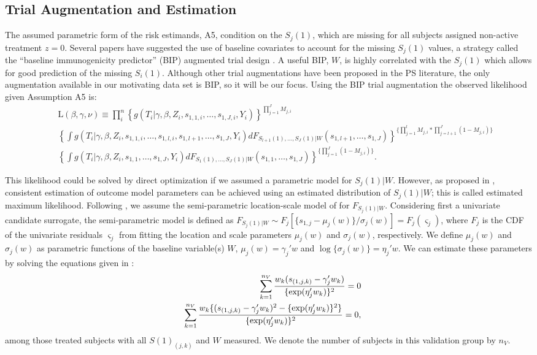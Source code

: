 \documentclass[times, doublespace]{simauth}
\begin{document}
\subsection{Trial Augmentation and Estimation} \label{EST}
The assumed parametric form of the risk estimands, A5, condition on the $S_{j}(1)$, which are missing for all subjects assigned non-active treatment $z=0$. Several papers have suggested the use of baseline covariates to account for the missing $S_{j}(1)$ values, a strategy called the ``baseline immunogenicity predictor'' (BIP) augmented trial design \citep{Follmann06, Gilbert08}. A useful BIP, $W$, is highly correlated with the $S_{j}(1)$ which allows for good prediction of the missing $S_i(1)$. Although other trial augmentations have been proposed in the PS literature, the only augmentation available in our motivating data set is BIP, so it will be our focus. Using the BIP trial augmentation the observed likelihood given Assumption A5 is:
\begin{eqnarray*}
&&\mbox{L}(\beta,\gamma,\nu) \equiv \prod^{n}_i\left\{g(T_i|\gamma, \beta, Z_i, s_{1,1,i},\ldots,s_{1,J,i}, Y_i)\right\}^{\prod_{j=1}^{J}{M_{j,i}}}\\ 
&&\left\{\int g(T_i|\gamma, \beta, Z_i,s_{1,1,i},\ldots, s_{1,l,i}, s_{1,l+1},\ldots, s_{1,J}, Y_i)dF_{S_{l+1}(1),\ldots,S_{J}(1)|W}(s_{1,l+1},\ldots,s_{1,J})\right\}^{\{\prod_{j=1}^{l}{M_{j,i}}*\prod_{j=l+1}^{J}{(1-M_{j,i})}\}}\\ 
&&\left\{\int g(T_i|\gamma, \beta, Z_i,s_{1,1}, \ldots, s_{1,J}, Y_i)dF_{S_{1}(1),\ldots, S_{J}(1)|W}(s_{1,1},\ldots, s_{1,J})\right\}^{\{\prod_{j=1}^{J}{(1-M_{j,i})}\}}.
\end{eqnarray*}

This likelihood could be solved by direct optimization if we assumed a parametric model for $S_j(1)|W$. However, as proposed in \citet{Pepe91}, consistent estimation of outcome model parameters can be achieved using an estimated distribution of $S_j(1)|W$; this is called estimated maximum likelihood. Following \citet{Huang11}, we assume the semi-parametric location-scale model of \citet{Heagerty99} for $F_{S_{j}(1)|W}$. Considering first a univariate candidate surrogate, the semi-parametric model is defined as $F_{S_{j}(1)|W} \sim F_j[\{s_{1,j} -\mu_j(w)\} / \sigma_j(w)]= F_j(\varsigma_j)$, where $F_j$ is the CDF of the univariate residuals $\varsigma_j$ from fitting the location and scale parameters $\mu_j(w)$ and $\sigma_j(w)$, respectively.  We define $\mu_j(w)$ and $\sigma_j(w)$ as parametric functions of the baseline variable(s) $W$, $\mu_j(w) = \gamma_j'w$ and $\log\{\sigma_j(w)\} = \eta_j'w$. We can estimate these parameters by solving the equations given in \citet{Heagerty99}:
\begin{eqnarray}
&&\sum_{k=1}^{n_V} {w_{k} (s_{(1,j,k)} - \gamma_j' w_{k} )\over \{\exp(\eta_j'w_k)\}^2} =0\\ \label{stuff}
&&\sum_{k=1}^{n_V} {w_{k}\{(s_{(1,j,k)} - \gamma_j' w_{k})^2 - \{\exp(\eta_j'w_k)\}^2\} \over \{\exp(\eta_j'w_k)\}^2}=0,\label{stuff2}
\end{eqnarray}
among those treated subjects with all $S(1)_{(j,k)}$ and $W$ measured. We denote the number of subjects in this validation group by $n_V$. 
\end{document}
